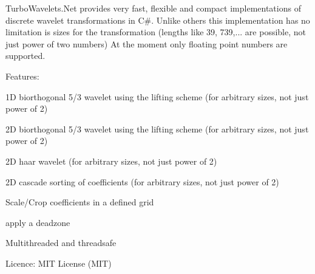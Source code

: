 \-Turbo\-Wavelets.\-Net provides very fast, flexible and compact implementations of discrete wavelet transformations in \-C\#. \-Unlike others this implementation has no limitation is sizes for the transformation (lengths like 39, 739,... are possible, not just power of two numbers) \-At the moment only floating point numbers are supported.

\-Features\-:
\begin{DoxyItemize}
\item 1\-D biorthogonal 5/3 wavelet using the lifting scheme (for arbitrary sizes, not just power of 2)
\item 2\-D biorthogonal 5/3 wavelet using the lifting scheme (for arbitrary sizes, not just power of 2)
\item 2\-D haar wavelet (for arbitrary sizes, not just power of 2)
\item 2\-D cascade sorting of coefficients (for arbitrary sizes, not just power of 2)
\item \-Scale/\-Crop coefficients in a defined grid
\item apply a deadzone
\item \-Multithreaded and threadsafe
\end{DoxyItemize}

\-Licence\-: \-M\-I\-T \-License (\-M\-I\-T) 